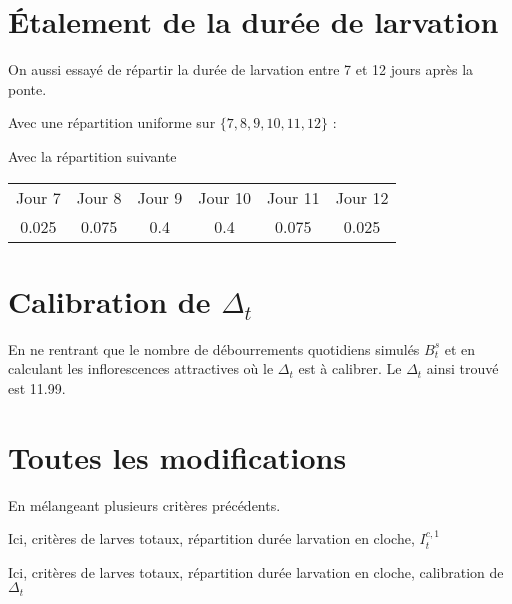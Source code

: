 \documentclass[a4paper, 11pt]{article}
\begin{document}
\newpage
\section{Étalement de la durée de larvation}

On aussi essayé de répartir la durée de larvation entre 7 et 12 jours après la ponte.

Avec une répartition uniforme sur $\{7, 8,9,10,11,12\}$ :
\begin{figure}[h]
 \centering
\end{figure}

Avec la répartition suivante \begin{center}
\begin{tabular}{cccccc}
Jour 7 & Jour 8 & Jour 9 & Jour 10 & Jour 11 & Jour 12\\
0.025 & 0.075 & 0.4 & 0.4 & 0.075 & 0.025
                           \end{tabular}
                           \end{center}

\begin{figure}[h]
 \centering
\end{figure}


\newpage
\section{Calibration de $\Delta_t$}

En ne rentrant que le nombre de débourrements quotidiens simulés $B_t^s$ et en calculant les inflorescences attractives où le $\Delta_t$ est à calibrer. Le $\Delta_t$ ainsi trouvé est 11.99.

\begin{figure}[h]
 \centering
\end{figure}




\newpage
\section{Toutes les modifications}

En mélangeant plusieurs critères précédents.

Ici, critères de larves totaux, répartition durée larvation en cloche, $I_t^{c,1}$

\begin{figure}[h]
 \centering
\end{figure}

Ici, critères de larves totaux, répartition durée larvation en cloche, calibration de $\Delta_t$

\begin{figure}[h]
 \centering
\end{figure}
\end{document}
